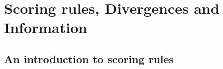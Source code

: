 \part{Scoring rules, Divergences and Information\label{part:1}}

\chapter{An introduction to scoring rules\label{sec:scoring_rules}}


% 